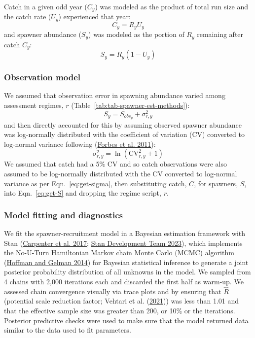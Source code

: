 \documentclass[11pt]{book}
\begin{document}
Catch in a given odd year (\(C_y\)) was modeled as the product of total run size and the catch rate (\(U_y\)) experienced that year:
\begin{equation}
 C_y = R_y U_y
\label{eq:harvest}
\end{equation}
and spawner abundance (\(S_y\)) was modeled as the portion of \(R_y\) remaining after catch \(C_y\):
\begin{equation}
S_y = R_y (1 - U_y)
\label{eq:get-S}
\end{equation}
\hypertarget{observation-model}{%
\subsubsection{Observation model}\label{observation-model}}

We assumed that observation error in spawning abundance varied among assessment regimes, \(r\) (Table~\ref{tab:tab-spawner-est-methods}):
\begin{equation}
S_y = S_{obs_y} + \sigma^2_{r,y}
\label{eq:get-S}
\end{equation}
and then directly accounted for this by assuming observed spawner abundance was log-normally distributed with the coefficient of variation (CV) converted to log-normal variance following (\protect\hyperlink{ref-forbes_statistical_2011}{Forbes et al. 2011}):
\begin{equation}
\sigma^2_{r,y} = \ln\left(\mathrm{CV}_{r,y}^2 + 1\right)
\label{eq:get-sigma}
\end{equation}
We assumed that catch had a 5\% CV and so catch observations were also assumed to be log-normally distributed with the CV converted to log-normal variance as per Eqn.~\ref{eq:get-sigma}, then substituting catch, \(C\), for spawners, \(S\), into Eqn.~\ref{eq:get-S} and dropping the regime script, \(r\).

\hypertarget{model-fitting-and-diagnostics}{%
\subsubsection{Model fitting and diagnostics}\label{model-fitting-and-diagnostics}}

We fit the spawner-recruitment model in a Bayesian estimation framework with Stan (\protect\hyperlink{ref-carpenter_stan_2017}{Carpenter et al. 2017}; \protect\hyperlink{ref-standevelopmentteamRstanInterfaceStan2023}{Stan Development Team 2023}), which implements the No-U-Turn Hamiltonian Markov chain Monte Carlo (MCMC) algorithm (\protect\hyperlink{ref-hoffman2014}{Hoffman and Gelman 2014}) for Bayesian statistical inference to generate a joint posterior probability distribution of all unknowns in the model. We sampled from 4 chains with 2,000 iterations each and discarded the first half as warm-up. We assessed chain convergence visually via trace plots and by ensuring that \(\hat{R}\) (potential scale reduction factor; Vehtari et al. (\protect\hyperlink{ref-vehtari2021rank}{2021})) was less than 1.01 and that the effective sample size was greater than 200, or 10\% or the iterations. Posterior predictive checks were used to make sure that the model returned data similar to the data used to fit parameters.
\end{document}
